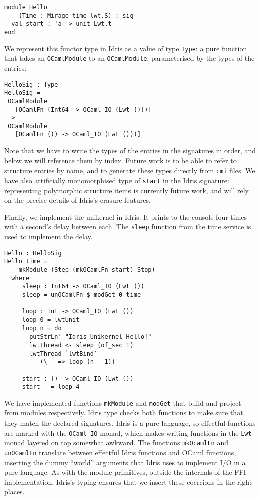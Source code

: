 \documentclass[a4paper,10pt,twocolumn]{article}
\begin{document}
\begin{lstlisting}
module Hello
    (Time : Mirage_time_lwt.S) : sig
  val start : 'a -> unit Lwt.t
end
\end{lstlisting}

We represent this functor type in Idris as a value of type
\texttt{Type}: a pure function that takes an \texttt{OCamlModule} to
an \texttt{OCamlModule}, parameterised by the types of the entries:
\begin{lstlisting}
HelloSig : Type
HelloSig =
 OCamlModule
   [OCamlFn (Int64 -> OCaml_IO (Lwt ()))]
 ->
 OCamlModule
   [OCamlFn (() -> OCaml_IO (Lwt ()))]
\end{lstlisting}
Note that we have to write the types of the entries in the signatures
in order, and below we will reference them by index. Future work is to
be able to refer to structure entries by name, and to generate these
types directly from \texttt{cmi} files. We have also artificially
monomorphised type of \texttt{start} in the Idris signature:
representing polymorphic structure items is currently future work, and
will rely on the precise details of Idris's erasure features.

Finally, we implement the unikernel in Idris. It prints to the console
four times with a second's delay between each. The \texttt{sleep}
function from the time service is used to implement the delay.
\begin{lstlisting}
Hello : HelloSig
Hello time =
    mkModule (Step (mkOCamlFn start) Stop)
  where
     sleep : Int64 -> OCaml_IO (Lwt ())
     sleep = unOCamlFn $ modGet 0 time

     loop : Int -> OCaml_IO (Lwt ())
     loop 0 = lwtUnit
     loop n = do
       putStrLn' "Idris Unikernel Hello!"
       lwtThread <- sleep (of_sec 1)
       lwtThread `lwtBind`
          (\ _ => loop (n - 1))

     start : () -> OCaml_IO (Lwt ())
     start _ = loop 4
\end{lstlisting}%
We have implemented functions \texttt{mkModule} and \texttt{modGet}
that build and project from modules respectively. Idris type checks
both functions to make sure that they match the declared
signatures. Idris is a pure language, so effectful functions are
marked with the \texttt{OCaml\_IO} monad, which makes writing
functions in the \texttt{Lwt} monad layered on top somewhat
awkward. The functions \texttt{mkOcamlFn} and \texttt{unOCamlFn}
translate between effectful Idris functions and OCaml functions,
inserting the dummy ``world'' arguments that Idris uses to implement
I/O in a pure language. As with the module primitives, outside the
internals of the FFI implementation, Idris's typing ensures that we
insert these coercions in the right places.
\end{document}
